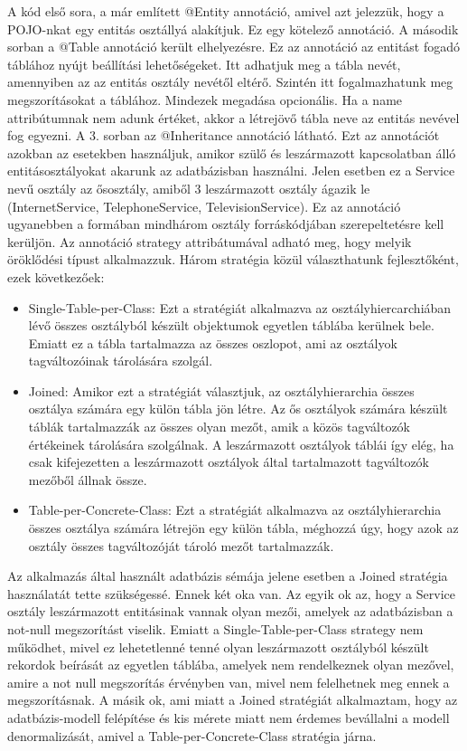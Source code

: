 \documentclass[centeredchapter]{thesis-ekf}
\theoremstyle{definition}
\theoremstyle{remark}
\begin{document}
A kód első sora, a már említett @Entity annotáció, amivel azt jelezzük, hogy a POJO-nkat egy entitás osztállyá alakítjuk. Ez egy kötelező annotáció. A második sorban a @Table annotáció került elhelyezésre. Ez az annotáció az entitást fogadó táblához nyújt beállítási lehetőségeket. Itt adhatjuk meg a tábla nevét, amennyiben az az entitás osztály nevétől eltérő. Szintén itt fogalmazhatunk meg megszorításokat a táblához. Mindezek megadása opcionális. Ha a name attribútumnak nem adunk értéket, akkor a létrejövő tábla neve az entitás nevével fog egyezni. A 3. sorban az @Inheritance annotáció látható. Ezt az annotációt azokban az esetekben használjuk, amikor szülő és leszármazott kapcsolatban álló entitásosztályokat akarunk az adatbázisban használni. Jelen esetben ez a Service nevű osztály az ősosztály, amiből 3 leszármazott osztály ágazik le (InternetService, TelephoneService, TelevisionService). Ez az annotáció ugyanebben a formában mindhárom osztály forráskódjában szerepeltetésre kell kerüljön. Az annotáció strategy attribátumával adható meg, hogy melyik öröklődési típust alkalmazzuk. Három stratégia közül választhatunk fejlesztőként, ezek  következőek:
\begin{itemize}
	\item Single-Table-per-Class: Ezt a stratégiát alkalmazva az osztályhiercarchiában lévő összes osztályból készült objektumok egyetlen táblába kerülnek bele. Emiatt ez a tábla tartalmazza az összes oszlopot, ami az osztályok tagváltozóinak tárolására szolgál. 
	\item Joined: Amikor ezt a stratégiát választjuk, az osztályhierarchia összes osztálya számára egy külön tábla jön létre. Az ős osztályok számára készült táblák tartalmazzák az összes olyan mezőt, amik a közös tagváltozók értékeinek tárolására szolgálnak. A leszármazott osztályok táblái így elég, ha csak kifejezetten a leszármazott osztályok által tartalmazott tagváltozók mezőből állnak össze.
	\item Table-per-Concrete-Class: Ezt a stratégiát alkalmazva az osztályhierarchia összes osztálya számára létrejön egy külön tábla, méghozzá úgy, hogy azok az osztály összes tagváltozóját tároló mezőt tartalmazzák.
\end{itemize}

Az alkalmazás által használt adatbázis sémája jelene esetben a Joined stratégia használatát tette szükségessé. Ennek két oka van.
Az egyik ok az, hogy a Service osztály leszármazott entitásinak vannak olyan mezői, amelyek az adatbázisban a not-null megszorítást viselik. Emiatt a Single-Table-per-Class strategy nem működhet, mivel ez lehetetlenné tenné olyan leszármazott osztályból készült rekordok beírását az egyetlen táblába, amelyek nem rendelkeznek olyan mezővel, amire a not null megszorítás érvényben van, mivel nem felelhetnek meg ennek a megszorításnak.
A másik ok, ami miatt a Joined stratégiát alkalmaztam, hogy az adatbázis-modell felépítése és kis mérete miatt nem érdemes bevállalni a modell denormalizását, amivel a Table-per-Concrete-Class stratégia járna.
\end{document}
